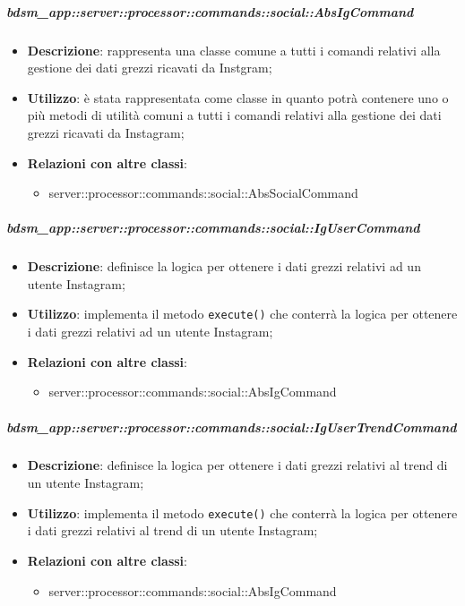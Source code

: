         \subparagraph{bdsm\_app::server::processor::commands::social::AbsIgCommand} %
        \label{subp:bdsm_app_server_processor_commands_social_absigcommand}
        \begin{itemize}
          \item \textbf{Descrizione}: rappresenta una classe comune a tutti i comandi relativi alla gestione dei dati grezzi ricavati da Instgram;
          \item \textbf{Utilizzo}: è stata rappresentata come classe in quanto potrà contenere uno o più metodi di utilità comuni a tutti i comandi relativi alla gestione dei dati grezzi ricavati da Instagram;
          \item \textbf{Relazioni con altre classi}:
            \begin{itemize}
              \item server::processor::commands::social::AbsSocialCommand
            \end{itemize}
        \end{itemize}

        \subparagraph{bdsm\_app::server::processor::commands::social::IgUserCommand} %
        \label{subp:bdsm_app_server_processor_commands_social_igusercommand}
        \begin{itemize}
          \item \textbf{Descrizione}: definisce la logica per ottenere i dati grezzi relativi ad un utente Instagram;
          \item \textbf{Utilizzo}: implementa il metodo \texttt{execute()} che conterrà la logica per ottenere i dati grezzi relativi ad un utente Instagram;
          \item \textbf{Relazioni con altre classi}:
            \begin{itemize}
              \item server::processor::commands::social::AbsIgCommand
            \end{itemize}
        \end{itemize}

        \subparagraph{bdsm\_app::server::processor::commands::social::IgUserTrendCommand} %
        \label{subp:bdsm_app_server_processor_commands_social_igusertrendcommand}
        \begin{itemize}
          \item \textbf{Descrizione}: definisce la logica per ottenere i dati grezzi relativi al trend di un utente Instagram;
          \item \textbf{Utilizzo}: implementa il metodo \texttt{execute()} che conterrà la logica per ottenere i dati grezzi relativi al trend di un utente Instagram;
          \item \textbf{Relazioni con altre classi}:
            \begin{itemize}
              \item server::processor::commands::social::AbsIgCommand
            \end{itemize}
        \end{itemize}

